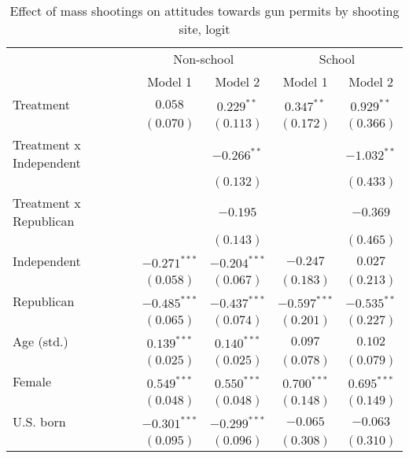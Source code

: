 
\begin{table}
\caption{Effect of mass shootings on attitudes towards gun permits by shooting site, logit}
\begin{center}
\begin{tabular}{l c c c c}
\toprule
 & \multicolumn{2}{c}{Non-school} & \multicolumn{2}{c}{School} \\
\cmidrule(lr){2-3} \cmidrule(lr){4-5}
 & Model 1 & Model 2 & Model 1 & Model 2 \\
\midrule
Treatment               & $0.058$        & $0.229^{**}$   & $0.347^{**}$   & $0.929^{**}$   \\
                        & $(0.070)$      & $(0.113)$      & $(0.172)$      & $(0.366)$      \\
Treatment x Independent &                & $-0.266^{**}$  &                & $-1.032^{**}$  \\
                        &                & $(0.132)$      &                & $(0.433)$      \\
Treatment x Republican  &                & $-0.195$       &                & $-0.369$       \\
                        &                & $(0.143)$      &                & $(0.465)$      \\
Independent             & $-0.271^{***}$ & $-0.204^{***}$ & $-0.247$       & $0.027$        \\
                        & $(0.058)$      & $(0.067)$      & $(0.183)$      & $(0.213)$      \\
Republican              & $-0.485^{***}$ & $-0.437^{***}$ & $-0.597^{***}$ & $-0.535^{**}$  \\
                        & $(0.065)$      & $(0.074)$      & $(0.201)$      & $(0.227)$      \\
Age (std.)              & $0.139^{***}$  & $0.140^{***}$  & $0.097$        & $0.102$        \\
                        & $(0.025)$      & $(0.025)$      & $(0.078)$      & $(0.079)$      \\
Female                  & $0.549^{***}$  & $0.550^{***}$  & $0.700^{***}$  & $0.695^{***}$  \\
                        & $(0.048)$      & $(0.048)$      & $(0.148)$      & $(0.149)$      \\
U.S. born               & $-0.301^{***}$ & $-0.299^{***}$ & $-0.065$       & $-0.063$       \\
                        & $(0.095)$      & $(0.096)$      & $(0.308)$      & $(0.310)$      \\

\end{tabular}
\end{center}
\end{table}
